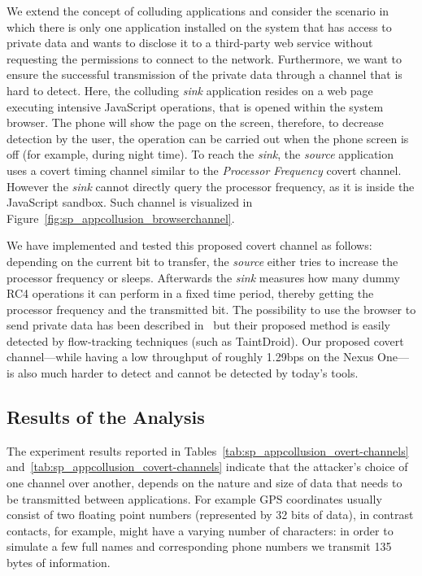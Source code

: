 We extend the concept of colluding applications and consider the
scenario in which there is only one application installed on the
system that has access to private data and wants to disclose it to a
third-party web service without requesting the permissions to connect
to the network. Furthermore, we want to ensure the successful
transmission of the private data through a channel that is hard to
detect. Here, the colluding \emph{sink} application resides on a web
page executing intensive JavaScript operations, that is opened within
the system browser. The phone will show the page on the screen,
therefore, to decrease detection by the user, the operation can be
carried out when the phone screen is off (for example, during night
time). To reach the \emph{sink}, the \emph{source} application uses a
covert timing channel similar to the \emph{Processor Frequency} covert
channel. However the \emph{sink} cannot directly query the processor
frequency, as it is inside the JavaScript sandbox. Such channel is
visualized in Figure~\ref{fig:sp_appcollusion_browserchannel}.

We have implemented and tested this proposed covert channel as
follows: depending on the current bit to transfer, the \emph{source}
either tries to increase the processor frequency or sleeps. Afterwards
the \emph{sink} measures how many dummy RC4 operations it can perform
in a fixed time period, thereby getting the processor frequency and
the transmitted bit. The possibility to use the browser to send
private data has been described in~\cite{permissions-browser} but
their proposed method is easily detected by flow-tracking techniques
(such as TaintDroid). Our proposed covert channel---while having a low
throughput of roughly 1.29bps on the Nexus One---is also much harder
to detect and cannot be detected by today's tools.

\subsection{Results of the Analysis}
\label{sec:sp_appcollusion_resultsanalysis}
The experiment results reported in Tables~\ref{tab:sp_appcollusion_overt-channels}
and~\ref{tab:sp_appcollusion_covert-channels} indicate that the attacker's choice of
one channel over another, depends on the nature and size of data that
needs to be transmitted between applications. For example GPS
coordinates usually consist of two floating point numbers (represented
by 32 bits of data), in contrast contacts, for example, might have a
varying number of characters: in order to simulate a few full names
and corresponding phone numbers we transmit 135 bytes of information.

